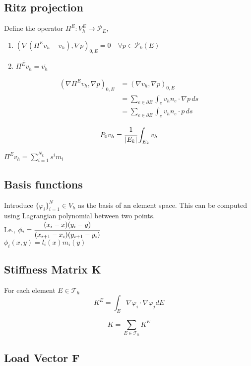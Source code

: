 \documentclass{article}
\begin{document}
\subsection{Ritz projection}
Define the operator $\Pi^E: V_h^E \rightarrow \mathcal{P}_E$,
\begin{enumerate}
    \item $(\nabla (\Pi^E v_h - v_h), \nabla p)_{0,E} = 0 \quad \forall p \in \mathcal{P}_k(E)$
    \item $\overline{\Pi^Ev_h} = \overline{v_h}$
\end{enumerate}

\begin{align*}
(\nabla \Pi^E v_h, \nabla p)_{0,E} &= (\nabla v_h, \nabla p)_{0,E} \\
&= \sum_{e \in \partial E} \int_e v_h n_e \cdot \nabla p \, ds \\
&= \sum_{e \in \partial E} \int_e v_h n_e \cdot p \, ds
\end{align*}


$$P_0v_h = \cfrac{1}{|E_k|}\int_{E_k}v_h$$

$\Pi^Ev_h = \sum_{i=1}^{N_k}s^im_i$

\subsection{Basis functions}
Introduce $\{\varphi_i\}^N_{i=1} \in V_h$ as the basis of an element space. This can be computed using Lagrangian polynomial between two points.\\
I.e., $\phi_i = \cfrac{(x_i-x)(y_i-y)}{(x_{i+1}-x_i)(y_{i+1}-y_i)}$\\

$\phi_i(x, y) = l_i(x) m_i(y)$



\subsection{Stiffness Matrix K}
For each element $E \in \mathcal{T}_h$
$$K^E = \int_E\nabla\varphi_i\cdot\nabla\varphi_j dE$$

\begin{equation}
    K = \sum_{E \in \mathcal{T}_h}K^E
\end{equation}

\subsection{Load Vector F}
\end{document}
